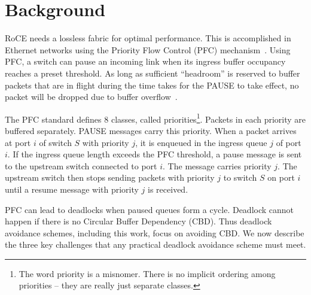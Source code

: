 \section{Background} \label{sec:background}  

 RoCE needs a lossless fabric for optimal performance. This is
accomplished in Ethernet networks using the Priority Flow Control (PFC)
mechanism~\cite{pfc}.  Using PFC, a switch can pause an incoming link when its
ingress buffer occupancy reaches a preset threshold. As long as sufficient
``headroom'' is reserved to buffer packets that are in flight during the time
takes for the PAUSE to take effect, no packet will be dropped due to buffer
overflow~\cite{ciscowhitepaper,dcqcn}.


The PFC standard defines 8 classes, called priorities\footnote{The word priority
is a misnomer. There is no implicit ordering among priorities -- they are really
just separate classes.}. Packets in each priority are buffered separately.
PAUSE messages carry this priority.  When a packet arrives at port $i$ of switch
$S$ with priority $j$, it is enqueued in the ingress queue $j$ of port $i$. If the ingress queue
length exceeds the PFC threshold, a pause message is sent to the upstream
switch connected to port $i$. The message carries priority $j$. The upstream
switch then stops sending packets with priority $j$ to switch $S$ on port $i$
until a resume message with priority $j$ is received.

 PFC can lead to deadlocks when paused queues form a cycle. Deadlock cannot happen if there is no Circular Buffer Dependency (CBD). Thus deadlock avoidance schemes, including this work, focus on
avoiding CBD.  We now describe the three key challenges that any
practical deadlock avoidance scheme must meet.
